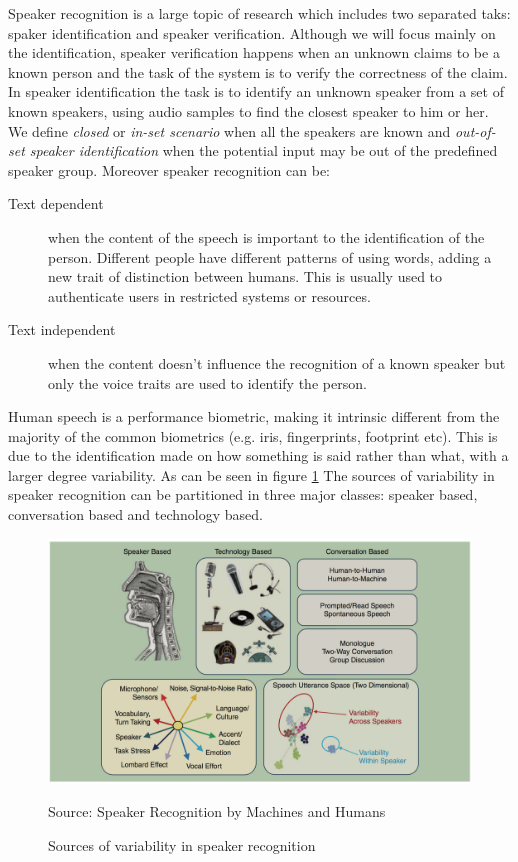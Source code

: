 Speaker recognition is a large topic of research which includes two separated taks: spaker
identification and speaker verification. Although we will focus mainly on the identification,
speaker verification happens when an unknown claims to be a known person and the task
of the system is to verify the correctness of the claim.
In speaker identification the task is to identify an unknown speaker from a set of known speakers,
using audio samples to find the closest speaker to him or her. We define \textit{closed} or \textit{in-set scenario}
when all the speakers are known and \textit{out-of-set speaker identification} when the potential input
may be out of the predefined speaker group.
Moreover speaker recognition can be:
\begin{description}
        \item[Text dependent] when the content of the speech is important to the
        identification of the person. Different people have different patterns of
        using words, adding a new trait of distinction between humans. This is usually
        used to authenticate users in restricted systems or resources.
        \item[Text independent] when the content doesn't influence the recognition
        of a known speaker but only the voice traits are used to identify the person.
\end{description}
Human speech is a performance biometric, making it intrinsic different from the majority
of the common biometrics (e.g. iris, fingerprints, footprint etc). This is due to the
identification made on how something is said rather than what, with a larger
degree variability. As can be seen in figure \ref{fig:sourcesvar} The sources of variability in speaker recognition can be partitioned
in three major classes: speaker based, conversation based and technology based.

\begin{figure}[h]
\caption{Sources of variability in speaker recognition}
\label{fig:sourcesvar}
\centering
\includegraphics[scale=0.20]{sourcesvariability.png}
\par{Source: Speaker Recognition by Machines and Humans}

\end{figure}

